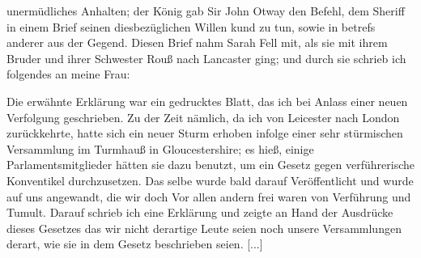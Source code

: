 unermüdliches Anhalten; der König gab Sir John Otway den
Befehl, dem Sheriff in einem Brief seinen diesbezüglichen Willen
kund zu tun, sowie in betrefs anderer aus der Gegend. Diesen
Brief nahm Sarah Fell mit, als sie mit ihrem Bruder und ihrer
Schwester Rouß nach Lancaster ging; und durch sie schrieb ich
folgendes an meine Frau:


Die erwähnte Erklärung war ein gedrucktes Blatt, das ich
bei Anlass einer neuen Verfolgung geschrieben. Zu der Zeit
nämlich, da ich von Leicester nach London zurückkehrte, hatte
sich ein neuer Sturm erhoben infolge einer sehr stürmischen
Versammlung im Turmhauß in Gloucestershire; es hieß, einige
Parlamentsmitglieder hätten sie dazu benutzt, um ein Gesetz gegen
verführerische Konventikel durchzusetzen. Das selbe wurde bald
darauf Veröffentlicht und wurde auf uns angewandt, die wir doch
Vor allen andern frei waren von Verführung und Tumult. Darauf
schrieb ich eine Erklärung und zeigte an Hand der Ausdrücke
dieses Gesetzes das wir nicht derartige Leute seien noch
unsere Versammlungen derart, wie sie in dem Gesetz beschrieben
seien. [...]

